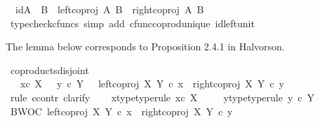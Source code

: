 \begin{isabellebody}
\ \ {\isachardoublequoteopen}id{\isacharparenleft}{\kern0pt}A\ {\isasymCoprod}\ B{\isacharparenright}{\kern0pt}\ {\isacharequal}{\kern0pt}\ {\isacharparenleft}{\kern0pt}left{\isacharunderscore}{\kern0pt}coproj\ A\ B{\isacharparenright}{\kern0pt}\ {\isasymamalg}\ {\isacharparenleft}{\kern0pt}right{\isacharunderscore}{\kern0pt}coproj\ A\ B{\isacharparenright}{\kern0pt}{\isachardoublequoteclose}\isanewline
%
\isadelimproof
\ \ \ \ %
\endisadelimproof
%
\isatagproof
{}\isamarkupfalse%
\ {\isacharparenleft}{\kern0pt}typecheck{\isacharunderscore}{\kern0pt}cfuncs{\isacharcomma}{\kern0pt}\ simp\ add{\isacharcolon}{\kern0pt}\ cfunc{\isacharunderscore}{\kern0pt}coprod{\isacharunderscore}{\kern0pt}unique\ id{\isacharunderscore}{\kern0pt}left{\isacharunderscore}{\kern0pt}unit{}{\isacharparenright}{\kern0pt}%
\endisatagproof
{\isafoldproof}%
%
\isadelimproof
%
\endisadelimproof
%
\begin{isamarkuptext}%
The lemma below corresponds to Proposition 2.4.1 in Halvorson.%
\end{isamarkuptext}\isamarkuptrue%
\isamarkupfalse%
\ coproducts{\isacharunderscore}{\kern0pt}disjoint{\isacharcolon}{\kern0pt}\isanewline
\ \ {\isachardoublequoteopen}\ x{\isasymin}\isactrlsub c\ X\ {\isasymLongrightarrow}\ \ y\ {\isasymin}\isactrlsub c\ Y\ {\isasymLongrightarrow}\ \ {\isacharparenleft}{\kern0pt}left{\isacharunderscore}{\kern0pt}coproj\ X\ Y{\isacharparenright}{\kern0pt}\ {\isasymcirc}\isactrlsub c\ x\ {\isasymnoteq}\ {\isacharparenleft}{\kern0pt}right{\isacharunderscore}{\kern0pt}coproj\ X\ Y{\isacharparenright}{\kern0pt}\ {\isasymcirc}\isactrlsub c\ y{\isachardoublequoteclose}\isanewline
%
\isadelimproof
%
\endisadelimproof
%
\isatagproof
{}\isamarkupfalse%
\ {\isacharparenleft}{\kern0pt}rule\ ccontr{\isacharcomma}{\kern0pt}\ clarify{\isacharparenright}{\kern0pt}\isanewline
\ \ \isamarkupfalse%
\ x{\isacharunderscore}{\kern0pt}type{\isacharbrackleft}{\kern0pt}type{\isacharunderscore}{\kern0pt}rule{\isacharbrackright}{\kern0pt}{\isacharcolon}{\kern0pt}\ {\isachardoublequoteopen}x{\isasymin}\isactrlsub c\ X{\isachardoublequoteclose}\ \isanewline
\ \ \isamarkupfalse%
\ y{\isacharunderscore}{\kern0pt}type{\isacharbrackleft}{\kern0pt}type{\isacharunderscore}{\kern0pt}rule{\isacharbrackright}{\kern0pt}{\isacharcolon}{\kern0pt}\ {\isachardoublequoteopen}y\ {\isasymin}\isactrlsub c\ Y{\isachardoublequoteclose}\isanewline
\ \ \isamarkupfalse%
\ BWOC{\isacharcolon}{\kern0pt}\ {\isachardoublequoteopen}{\isacharparenleft}{\kern0pt}{\isacharparenleft}{\kern0pt}left{\isacharunderscore}{\kern0pt}coproj\ X\ Y{\isacharparenright}{\kern0pt}\ {\isasymcirc}\isactrlsub c\ x\ {\isacharequal}{\kern0pt}\ {\isacharparenleft}{\kern0pt}right{\isacharunderscore}{\kern0pt}coproj\ X\ Y{\isacharparenright}{\kern0pt}\ {\isasymcirc}\isactrlsub c\ y{\isacharparenright}{\kern0pt}{\isachardoublequoteclose}\isanewline

\end{isabellebody}
